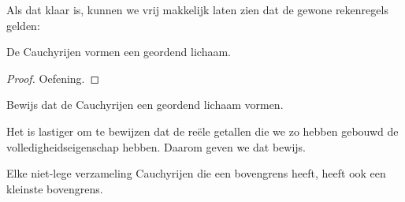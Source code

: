 \documentclass[../../../include/open-logic-section]{subfiles}
\begin{document}
Als dat klaar is, kunnen we vrij makkelijk laten zien dat de gewone
rekenregels gelden:
\begin{thm}
De Cauchyrijen vormen een geordend lichaam.
\end{thm}
\begin{proof}
Oefening.
\end{proof}
\begin{prob}
Bewijs dat de Cauchyrijen een geordend lichaam vormen.
\end{prob}
Het is lastiger om te bewijzen dat de reële getallen die we zo hebben
gebouwd de volledigheidseigenschap hebben. Daarom geven we dat bewijs.
\begin{thm}
Elke niet-lege verzameling Cauchyrijen die een bovengrens heeft, heeft
ook een kleinste bovengrens.
\end{thm}
\end{document}
